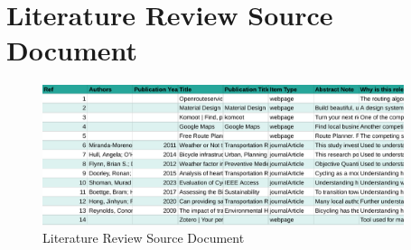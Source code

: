 \chapter{Literature Review Source Document}
\begin{figure}[ht!]
    \centering
    \includegraphics[width=400px]{figures/literature-review-source.pdf}
    \caption{Literature Review Source Document}
    \label{fig:lit-review-source}
\end{figure}
